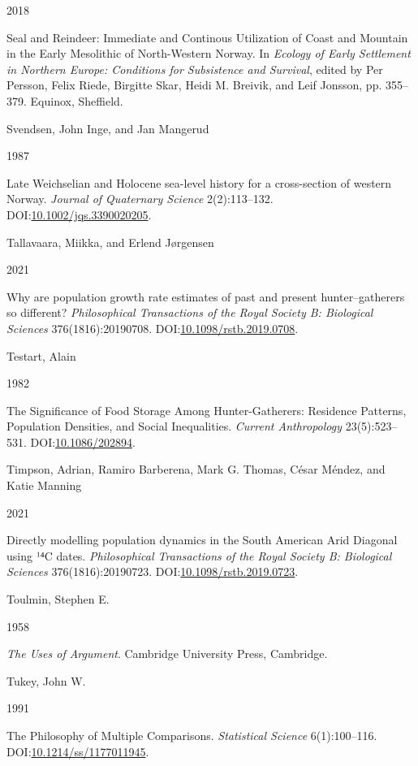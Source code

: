 \documentclass[
  12pt,
  a4paper,
  oneside]{book}
\newlength{\cslhangindent}
\newlength{\csllabelwidth}
\newlength{\cslentryspacingunit} %
\newenvironment{CSLReferences}[2] %
 {%
  \setlength{\parindent}{0pt}
  \ifodd #1
  \let\oldpar\par
  \def\par{\hangindent=\cslhangindent\oldpar}
  \fi
  \setlength{\parskip}{#2\cslentryspacingunit}
 }%
 {}
\newcommand{\CSLBlock}[1]{#1\hfill\break}
\newcommand{\CSLLeftMargin}[1]{\parbox[t]{\csllabelwidth}{#1}}
\newcommand{\CSLRightInline}[1]{\parbox[t]{\linewidth - \csllabelwidth}{#1}\break}
\begin{document}
\begin{CSLReferences}{0}{0}
\leavevmode{}%
\CSLLeftMargin{ 2018 }%
\CSLRightInline{{Seal and Reindeer: Immediate and Continous Utilization of Coast and Mountain in the Early Mesolithic of North-Western Norway}. In \emph{{Ecology of Early Settlement in Northern Europe: Conditions for Subsistence and Survival}}, edited by Per Persson, Felix Riede, Birgitte Skar, Heidi M. Breivik, and Leif Jonsson, pp. 355--379. Equinox, Sheffield.}

\leavevmode{}%
\CSLBlock{Svendsen, John Inge, and Jan Mangerud}
\CSLLeftMargin{ 1987}%
\CSLRightInline{Late Weichselian and Holocene sea-level history for a cross-section of western Norway. \emph{Journal of Quaternary Science} 2(2):113--132. DOI:\href{https://doi.org/10.1002/jqs.3390020205}{10.1002/jqs.3390020205}.}

\leavevmode{}%
\CSLBlock{Tallavaara, Miikka, and Erlend Jørgensen}
\CSLLeftMargin{ 2021}%
\CSLRightInline{Why are population growth rate estimates of past and present hunter--gatherers so different? \emph{Philosophical Transactions of the Royal Society B: Biological Sciences} 376(1816):20190708. DOI:\href{https://doi.org/10.1098/rstb.2019.0708}{10.1098/rstb.2019.0708}.}

\leavevmode{}%
\CSLBlock{Testart, Alain}
\CSLLeftMargin{ 1982}%
\CSLRightInline{{The Significance of Food Storage Among Hunter-Gatherers: Residence Patterns, Population Densities, and Social Inequalities}. \emph{Current Anthropology} 23(5):523--531. DOI:\href{https://doi.org/10.1086/202894}{10.1086/202894}.}

\leavevmode{}%
\CSLBlock{Timpson, Adrian, Ramiro Barberena, Mark G. Thomas, César Méndez, and Katie Manning}
\CSLLeftMargin{ 2021}%
\CSLRightInline{Directly modelling population dynamics in the South American Arid Diagonal using ¹⁴C dates. \emph{Philosophical Transactions of the Royal Society B: Biological Sciences} 376(1816):20190723. DOI:\href{https://doi.org/10.1098/rstb.2019.0723}{10.1098/rstb.2019.0723}.}

\leavevmode{}%
\CSLBlock{Toulmin, Stephen E.}
\CSLLeftMargin{ 1958}%
\CSLRightInline{\emph{{The Uses of Argument}}. Cambridge University Press, Cambridge.}

\leavevmode{}%
\CSLBlock{Tukey, John W.}
\CSLLeftMargin{ 1991}%
\CSLRightInline{{The Philosophy of Multiple Comparisons}. \emph{Statistical Science} 6(1):100--116. DOI:\href{https://doi.org/10.1214/ss/1177011945}{10.1214/ss/1177011945}.}


\end{CSLReferences}
\end{document}
